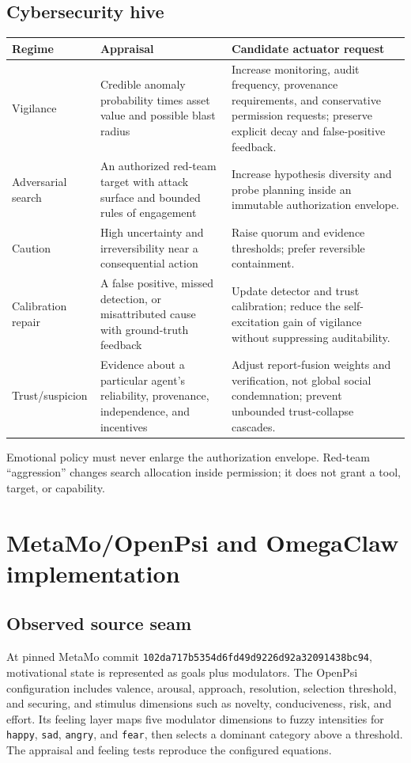 \documentclass[11pt]{article}
\begin{document}
\subsection{Cybersecurity hive}

\begin{longtable}{p{}p{}p{}}
\toprule
Regime & Appraisal & Candidate actuator request \\
\midrule
Vigilance & Credible anomaly probability times asset value and possible blast
radius & Increase monitoring, audit frequency, provenance requirements, and
conservative permission requests; preserve explicit decay and false-positive
feedback. \\
Adversarial search & An authorized red-team target with attack surface and
bounded rules of engagement & Increase hypothesis diversity and probe planning
inside an immutable authorization envelope. \\
Caution & High uncertainty and irreversibility near a consequential action &
Raise quorum and evidence thresholds; prefer reversible containment. \\
Calibration repair & A false positive, missed detection, or misattributed cause
with ground-truth feedback & Update detector and trust calibration; reduce the
self-excitation gain of vigilance without suppressing auditability. \\
Trust/suspicion & Evidence about a particular agent's reliability, provenance,
independence, and incentives & Adjust report-fusion weights and verification,
not global social condemnation; prevent unbounded trust-collapse cascades. \\
\bottomrule
\end{longtable}

Emotional policy must never enlarge the authorization envelope.  Red-team
``aggression'' changes search allocation inside permission; it does not grant a
tool, target, or capability.

\section{MetaMo/OpenPsi and OmegaClaw implementation}

\subsection{Observed source seam}

At pinned MetaMo commit
\texttt{102da717b5354d6fd49d9226d92a32091438bc94}, motivational state is represented
as goals plus modulators.  The OpenPsi configuration includes valence, arousal,
approach, resolution, selection threshold, and securing, and stimulus dimensions
such as novelty, conduciveness, risk, and effort.  Its feeling layer maps five
modulator dimensions to fuzzy intensities for \texttt{happy}, \texttt{sad},
\texttt{angry}, and \texttt{fear}, then selects a dominant category above a
threshold.  The appraisal and feeling tests reproduce the configured equations.
\end{document}

